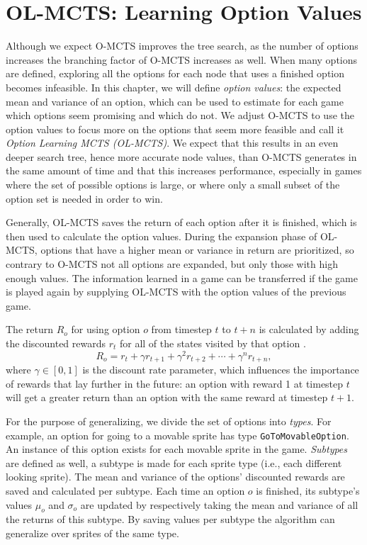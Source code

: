 \chapter{OL-MCTS: Learning Option Values} 
\label{sec:learning} 
Although we expect O-MCTS improves the tree search, as the number of options
increases the branching factor of O-MCTS increases as well. When many
options are defined, exploring all the options for each node that uses a
finished option becomes infeasible. In this chapter, we will define \emph{option
values}: the expected mean and variance of an option, which can be used to
estimate for each game which options seem promising and which do not. We adjust O-MCTS to use
the option values to focus more on the options that seem more feasible and call
it \emph{Option Learning MCTS (OL-MCTS)}. We expect that this results in an even
deeper search tree, hence more accurate node values, than O-MCTS generates in
the same amount of time and that this increases performance, especially in games
where the set of possible options is large, or where only a small subset of the
option set is needed in order to win.

Generally, OL-MCTS saves the return of each option after it is finished, which
is then used to calculate the option values. During the expansion phase of
OL-MCTS, options that have a higher mean or variance in return are prioritized,
so contrary to O-MCTS not all options are expanded, but only those with high
enough values. The information learned in a game can be transferred if the game
is played again by supplying OL-MCTS with the option values of the previous
game. 

The return $R_o$ for using option $o$ from timestep $t$ to $t+n$ is calculated
by adding the discounted rewards $r_t$ for all of the states visited by that
option \cite{sutton1999between}. $$R_o = r_{t} + \gamma r_{t+1} + \gamma^2 r_{t+2} + \cdots + \gamma^n
r_{t+n},$$ where $\gamma \in [0, 1]$ is the discount rate parameter, which
influences the importance of rewards that lay further in the future: an option
with reward 1 at timestep $t$ will get a greater return than an option with the
same reward at timestep $t+1$.  

For the purpose of generalizing, we divide the set of options into \emph{types}.
For example, an option for going to a movable sprite has type
\texttt{GoToMovableOption}. An instance of this option exists for each movable
sprite in the game. \emph{Subtypes} are defined as well, a subtype is made for
each sprite type (i.e., each different looking sprite). The mean and variance of
the options' discounted rewards are saved and calculated per subtype. Each time
an option $o$ is finished, its subtype's values $\mu_o$ and $\sigma_o$ are
updated by respectively taking the mean and variance of all the returns of this
subtype. By saving values per subtype the algorithm can generalize over sprites
of the same type.

